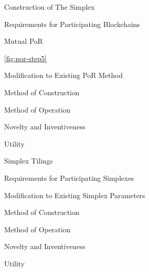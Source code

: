 \documentclass[a4paper,]{article}
\begin{document}
\begin{section}{Construction of The Simplex}

 \begin{subsection}{Requirements for Participating Blockchains}

     \begin{subsubsection}{Mutual PoR}

        \autoref{fig:por-step5}

     \end{subsubsection}

 \end{subsection}
 \begin{subsection}{Modification to Existing PoR Method}

 \end{subsection}
 \begin{subsection}{Method of Construction}

 \end{subsection}
 \begin{subsection}{Method of Operation}

 \end{subsection}
 \begin{subsection}{Novelty and Inventiveness}

 \end{subsection}
 \begin{subsection}{Utility}

 \end{subsection}
\end{section}

\begin{section}{Simplex Tilings}

 \begin{subsection}{Requirements for Participating Simplexes}

 \end{subsection}
 \begin{subsection}{Modification to Existing Simplex Parameters}

 \end{subsection}
 \begin{subsection}{Method of Construction}

 \end{subsection}
 \begin{subsection}{Method of Operation}

 \end{subsection}
 \begin{subsection}{Novelty and Inventiveness}

 \end{subsection}
 \begin{subsection}{Utility}

 \end{subsection}
\end{section}
\end{document}
